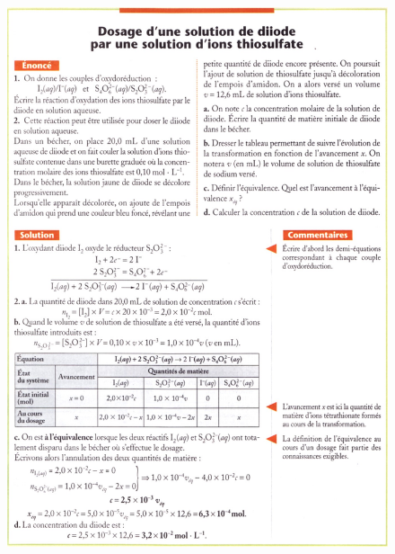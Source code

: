 \documentclass[11pt,a4paper]{article}
\begin{document}
\begin{figure}[h]
    \centering
    \includegraphics[width=\linewidth]{imgs/c1/xo2.jpg}
\end{figure} 
\end{document}
